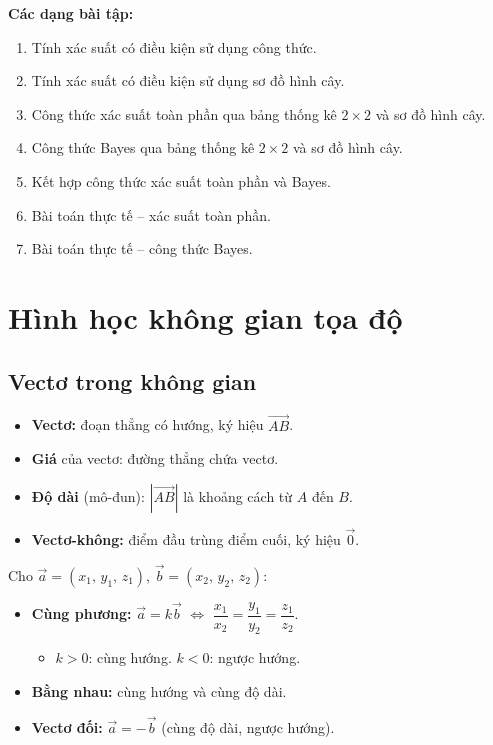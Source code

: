 \documentclass[12pt,a4paper]{article}
\begin{document}
\medskip\noindent\textbf{Các dạng bài tập:}
\begin{enumerate}[label=\textbf{Dạng \arabic*:}, leftmargin=*, align=left]
  \item Tính xác suất có điều kiện sử dụng công thức.
  \item Tính xác suất có điều kiện sử dụng sơ đồ hình cây.
  \item Công thức xác suất toàn phần qua bảng thống kê $2 \times 2$ và sơ đồ hình cây.
  \item Công thức Bayes qua bảng thống kê $2 \times 2$ và sơ đồ hình cây.
  \item Kết hợp công thức xác suất toàn phần và Bayes.
  \item Bài toán thực tế -- xác suất toàn phần.
  \item Bài toán thực tế -- công thức Bayes.
\end{enumerate}

\newpage
\section{Hình học không gian tọa độ}

\subsection{Vectơ trong không gian}

\begin{dinhnghia}
  \begin{itemize}
    \item \textbf{Vectơ:} đoạn thẳng có hướng, ký hiệu $\overrightarrow{AB}$.
    \item \textbf{Giá} của vectơ: đường thẳng chứa vectơ.
    \item \textbf{Độ dài} (mô-đun): $|\overrightarrow{AB}|$ là khoảng cách từ $A$ đến $B$.
    \item \textbf{Vectơ-không:} điểm đầu trùng điểm cuối, ký hiệu $\vec{0}$.
  \end{itemize}
\end{dinhnghia}

\begin{tinhchat}
  Cho $\vec{a} = (x_1,\, y_1,\, z_1)$, $\vec{b} = (x_2,\, y_2,\, z_2)$:
  \begin{itemize}
    \item \textbf{Cùng phương:} $\vec{a} = k\vec{b}$ $\Leftrightarrow$ $\dfrac{x_1}{x_2} = \dfrac{y_1}{y_2} = \dfrac{z_1}{z_2}$.
    \begin{itemize}
      \item $k > 0$: cùng hướng. \qquad $k < 0$: ngược hướng.
    \end{itemize}
    \item \textbf{Bằng nhau:} cùng hướng và cùng độ dài.
    \item \textbf{Vectơ đối:} $\vec{a} = -\vec{b}$ (cùng độ dài, ngược hướng).
  \end{itemize}
\end{tinhchat}
\end{document}
